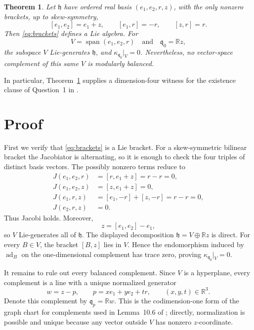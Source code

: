 \documentclass[11pt]{article}
\newtheorem{theorem}{Theorem}
\newcommand{\R}{\mathbb{R}}
\newcommand{\h}{\mathfrak{h}}
\newcommand{\q}{\mathfrak{q}}
\newcommand{\ad}{\operatorname{ad}}
\begin{document}
\begin{theorem}\label{thm:main}
Let \(\h\) have ordered real basis \((e_1,e_2,r,z)\), with the only nonzero
brackets, up to skew-symmetry,
\begin{equation}\label{eq:brackets}
 [e_1,e_2]=e_1+z,
 \qquad [e_1,r]=-r,
 \qquad [z,r]=r.
\end{equation}
Then \eqref{eq:brackets} defines a Lie algebra.  For
\[
 V=\operatorname{span}(e_1,e_2,r)
 \quad\text{and}\quad
 \q_0=\R z,
\]
the subspace \(V\) Lie-generates \(\h\), and
\(\kappa_{\q_0}|_V=0\).  Nevertheless, no vector-space complement of this
same \(V\) is modularly balanced.
\end{theorem}

In particular, Theorem~\ref{thm:main} supplies a dimension-four witness for
the existence clause of Question~1 in
\cite{NicolussiGoloPinamontiWarhurst2026}.

\section{Proof}

First we verify that \eqref{eq:brackets} is a Lie bracket.  For a
skew-symmetric bilinear bracket the Jacobiator is alternating, so it is
enough to check the four triples of distinct basis vectors.  The possibly
nonzero terms reduce to
\begin{align*}
 J(e_1,e_2,r)&=[r,e_1+z]=r-r=0,\\
 J(e_1,e_2,z)&=[z,e_1+z]=0,\\
 J(e_1,r,z)&=[e_1,-r]+[z,-r]=r-r=0,\\
 J(e_2,r,z)&=0.
\end{align*}
Thus Jacobi holds.  Moreover,
\[
 z=[e_1,e_2]-e_1,
\]
so \(V\) Lie-generates all of \(\h\).  The displayed decomposition
\(\h=V\oplus\R z\) is direct.  For every \(B\in V\), the bracket
\([B,z]\) lies in \(V\).  Hence the endomorphism induced by \(\ad_B\) on
the one-dimensional complement has trace zero, proving
\(\kappa_{\q_0}|_V=0\).

It remains to rule out every balanced complement.  Since \(V\) is a
hyperplane, every complement is a line with a unique normalized generator
\begin{equation}\label{eq:w}
 w=z-p,
 \qquad p=xe_1+ye_2+tr,
 \qquad (x,y,t)\in\R^3.
\end{equation}
Denote this complement by \(\q_p=\R w\).  This is the codimension-one form
of the graph chart for complements used in Lemma~10.6 of
\cite{NicolussiGoloPinamontiWarhurst2026}; directly, normalization is
possible and unique because any vector outside \(V\) has nonzero
\(z\)-coordinate.
\end{document}

